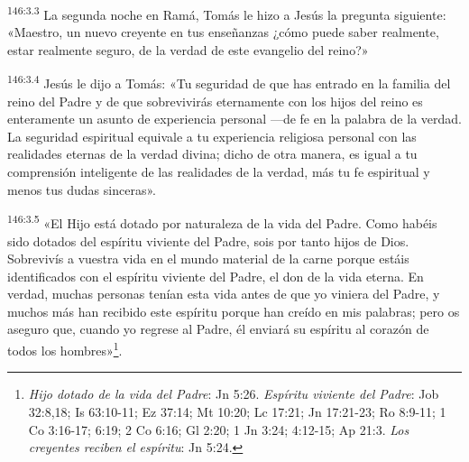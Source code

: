 \par 
\textsuperscript{146:3.3} La segunda noche en Ramá, Tomás le hizo a Jesús la pregunta siguiente: «Maestro, un nuevo creyente en tus enseñanzas ¿cómo puede saber realmente, estar realmente seguro, de la verdad de este evangelio del reino?»

\par 
\textsuperscript{146:3.4} Jesús le dijo a Tomás: «Tu seguridad de que has entrado en la familia del reino del Padre y de que sobrevivirás eternamente con los hijos del reino es enteramente un asunto de experiencia personal ---de fe en la palabra de la verdad. La seguridad espiritual equivale a tu experiencia religiosa personal con las realidades eternas de la verdad divina; dicho de otra manera, es igual a tu comprensión inteligente de las realidades de la verdad, más tu fe espiritual y menos tus dudas sinceras».

\par 
\textsuperscript{146:3.5} «El Hijo está dotado por naturaleza de la vida del Padre. Como habéis sido dotados del espíritu viviente del Padre, sois por tanto hijos de Dios. Sobrevivís a vuestra vida en el mundo material de la carne porque estáis identificados con el espíritu viviente del Padre, el don de la vida eterna. En verdad, muchas personas tenían esta vida antes de que yo viniera del Padre, y muchos más han recibido este espíritu porque han creído en mis palabras; pero os aseguro que, cuando yo regrese al Padre, él enviará su espíritu al corazón de todos los hombres»\footnote{\textit{Hijo dotado de la vida del Padre}: Jn 5:26. \textit{Espíritu viviente del Padre}: Job 32:8,18; Is 63:10-11; Ez 37:14; Mt 10:20; Lc 17:21; Jn 17:21-23; Ro 8:9-11; 1 Co 3:16-17; 6:19; 2 Co 6:16; Gl 2:20; 1 Jn 3:24; 4:12-15; Ap 21:3. \textit{Los creyentes reciben el espíritu}: Jn 5:24.}.

